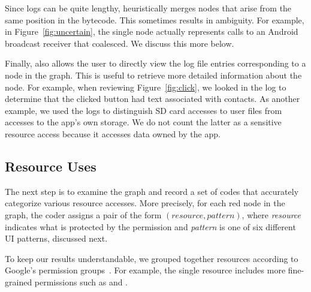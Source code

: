 Since logs can be quite lengthy, \apptracer{} heuristically merges
nodes that arise from the same position in the bytecode. This
sometimes results in ambiguity. For example, in
Figure~\ref{fig:uncertain}, the single  node actually
represents calls to an Android broadcast receiver that \apptracer{}
coalesced. We discuss this more below.


Finally, \apptracer{} also allows the user to directly view the
log file entries corresponding to a node in the graph. This is
useful to retrieve more detailed information about the node. For
example, when reviewing Figure~\ref{fig:click}, we looked in the log
to determine that the clicked button had text associated with contacts.  As
another example, we used the logs to distinguish SD card accesses to
user files from accesses to the app's own storage. We do not count the 
latter as a sensitive resource access because it accesses data owned by 
the app. 

\subsection{Resource Uses}

The next step is to examine the \apptracer{} graph and record a set of
codes that accurately categorize various resource accesses.
More precisely, for each red node in the graph, the coder
assigns a pair of the form $(\textit{resource}, \textit{pattern})$,
where \textit{resource} indicates what is protected by the permission
and \textit{pattern} is one of six different UI patterns, discussed
next.

To keep our results understandable, we grouped together resources
according to Google's permission
groups~\cite{permissiongroups}. For example, the single 
resource includes more fine-grained permissions such as  and
.

